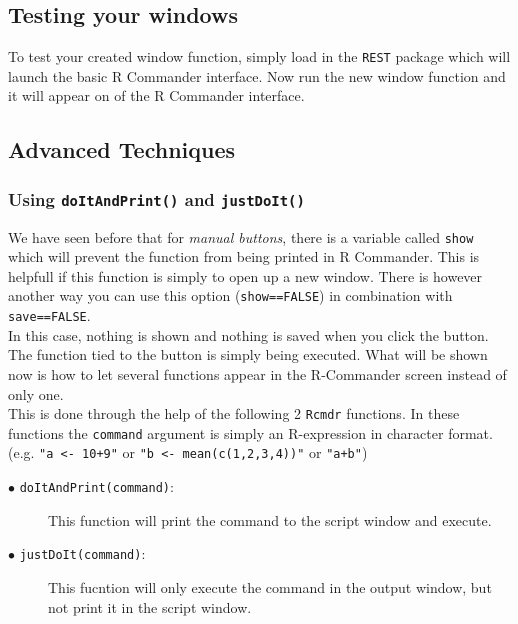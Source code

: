 \documentclass[a4paper]{article}\usepackage[]{graphicx}\usepackage[]{color}
\begin{document}
\subsection{Testing your windows}
To test your created window function, simply load in the \texttt{REST} package
which will launch the basic R Commander interface. Now run the new window
function and it will appear on of the R Commander interface.

\subsection{Advanced Techniques}
\subsubsection{Using \texttt{doItAndPrint()} and \texttt{justDoIt()}}
\label{sec:doitandprint}
We have seen before that for {\it manual buttons}, there is a variable called
\verb|show| which will prevent the function from being printed in R Commander.
This is helpfull if this function is simply to open up a new window. There is
however another way you can use this option (\verb|show==FALSE|) in combination
with \verb|save==FALSE|. \\
In this case, nothing is shown and nothing is saved when you click the button.
The function tied to the button is simply being executed. What will be shown now
is how to let several functions appear in the R-Commander screen instead of only
one.\\
This is done through the help of the following 2 \verb|Rcmdr| functions. In
these functions the \verb|command| argument is simply an R-expression in
character format. (e.g. \verb|"a <- 10+9"| or \verb|"b <- mean(c(1,2,3,4))"| or \verb|"a+b"|)
\begin{description}
  \item[$\bullet$ \texttt{doItAndPrint(command)}:] This function will print the
  command to the script window and execute.
  \item[$\bullet$ \texttt{justDoIt(command)}:] This fucntion will only execute
  the command in the output window, but not print it in the script window.
\end{description}
\end{document}
